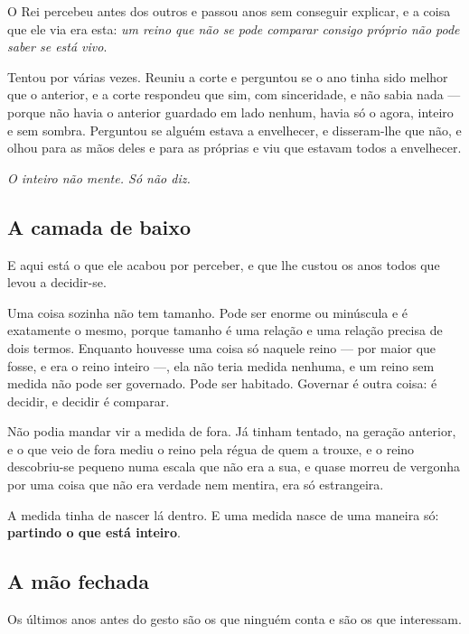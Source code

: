 \documentclass[livro.tex]{subfiles}
\begin{document}
O Rei percebeu antes dos outros e passou anos sem conseguir explicar, e a coisa que ele via era
esta: \emph{um reino que não se pode comparar consigo próprio não pode saber se está vivo}.

\medskip

Tentou por várias vezes. Reuniu a corte e perguntou se o ano tinha sido melhor que o anterior, e a
corte respondeu que sim, com sinceridade, e não sabia nada --- porque não havia o anterior guardado
em lado nenhum, havia só o agora, inteiro e sem sombra. Perguntou se alguém estava a envelhecer, e
disseram-lhe que não, e olhou para as mãos deles e para as próprias e viu que estavam todos a
envelhecer.

\medskip

\emph{O inteiro não mente. Só não diz.}

\subsection*{A camada de baixo}

E aqui está o que ele acabou por perceber, e que lhe custou os anos todos que levou a decidir-se.

\medskip

Uma coisa sozinha não tem tamanho. Pode ser enorme ou minúscula e é exatamente o mesmo, porque
tamanho é uma relação e uma relação precisa de dois termos. Enquanto houvesse uma coisa só naquele
reino --- por maior que fosse, e era o reino inteiro ---, ela não teria medida nenhuma, e um reino
sem medida não pode ser governado. Pode ser habitado. Governar é outra coisa: é decidir, e decidir
é comparar.

\medskip

Não podia mandar vir a medida de fora. Já tinham tentado, na geração anterior, e o que veio de fora
mediu o reino pela régua de quem a trouxe, e o reino descobriu-se pequeno numa escala que não era a
sua, e quase morreu de vergonha por uma coisa que não era verdade nem mentira, era só estrangeira.

\medskip

A medida tinha de nascer lá dentro. E uma medida nasce de uma maneira só: \textbf{partindo o que
está inteiro}.

\subsection*{A mão fechada}

Os últimos anos antes do gesto são os que ninguém conta e são os que interessam.
\end{document}
